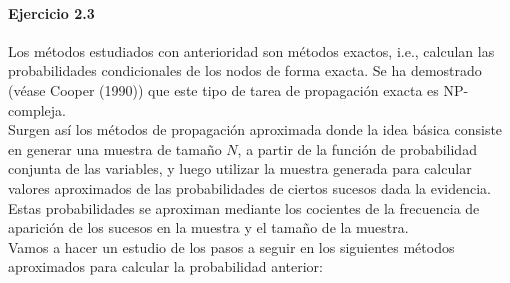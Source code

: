 \documentclass[12pt,a4paper]{article}
\begin{document}
\paragraph*{Ejercicio 2.3}
Los métodos estudiados con anterioridad son métodos exactos, i.e., calculan las probabilidades condicionales de los nodos de forma exacta. Se ha demostrado (véase Cooper (1990)) que este tipo de tarea de propagación exacta es NP-compleja. \\
Surgen así los métodos de propagación aproximada donde la idea básica consiste en generar una muestra de tamaño $N$, a partir de la función de probabilidad conjunta de las variables, y luego utilizar la muestra generada para calcular valores aproximados de las probabilidades de ciertos sucesos dada la evidencia. Estas probabilidades se aproximan mediante los cocientes de la frecuencia de aparición de los sucesos en la muestra y el tamaño de la muestra.\\

Vamos a hacer un estudio de los pasos a seguir en los siguientes métodos aproximados para calcular la probabilidad anterior:
\end{document}
